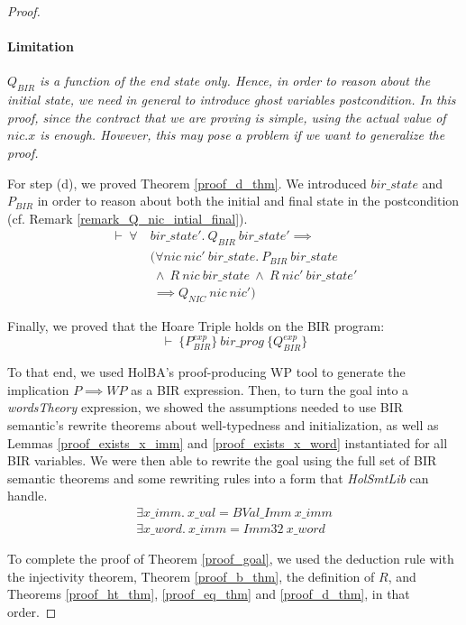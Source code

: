 \documentclass[10pt,a4paper]{article}
\newcommand{\htriple}[3]{\ensuremath{\{#1\}~#2~\{#3\}}}
\begin{document}
\begin{multicols}{2}
\begin{proof}
\paragraph{Limitation} \textit{$Q_{BIR}$ is a function of the end state only. Hence, in order to reason about the initial state, we need in general to introduce ghost variables postcondition. In this proof, since the contract that we are proving is simple, using the actual value of $nic.x$ is enough. However, this may pose a problem if we want to generalize the proof.}
\medskip

For step (d), we proved Theorem \ref{proof_d_thm}. We introduced $bir\_state$ and $P_{BIR}$ in order to reason about both the initial and final state in the postcondition (cf. Remark \ref{remark_Q_nic_intial_final}).
%
\begin{equation} \label{proof_d_thm}
\begin{split}
\vdash~\forall~&bir\_state'.~Q_{BIR}~bir\_state' \implies\\
	&(\forall nic~nic'~bir\_state.~P_{BIR}~bir\_state\\
	&~\land~R~nic~bir\_state~\land~R~nic'~bir\_state'\\
	&~\implies Q_{NIC}~nic~nic')
\end{split}
\end{equation}

Finally, we proved that the Hoare Triple holds on the BIR program:
%
\begin{equation} \label{proof_ht_thm}
\vdash~\htriple{P^{exp}_{BIR}}{bir\_prog}{Q^{exp}_{BIR}}
\end{equation}

To that end, we used HolBA's proof-producing WP tool to generate the implication $P \implies WP$ as a BIR expression. Then, to turn the goal into a \textit{wordsTheory} expression, we showed the assumptions needed to use BIR semantic's rewrite theorems about well-typedness and initialization, as well as Lemmas \ref{proof_exists_x_imm} and \ref{proof_exists_x_word} instantiated for all BIR variables. We were then able to rewrite the goal using the full set of BIR semantic theorems and some rewriting rules into a form that \textit{HolSmtLib} can handle.
%
\begin{align}
  \label{proof_exists_x_imm}
  \exists x\_imm.~x\_val = BVal\_Imm~x\_imm\\
  \label{proof_exists_x_word}
  \exists x\_word.~x\_imm = Imm32~x\_word
\end{align}

To complete the proof of Theorem \ref{proof_goal}, we used the deduction rule with the injectivity theorem, Theorem \ref{proof_b_thm}, the definition of $R$, and Theorems \ref{proof_ht_thm}, \ref{proof_eq_thm} and \ref{proof_d_thm}, in that order.
\end{proof}


\end{multicols}
\end{document}
